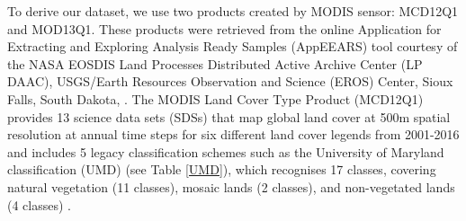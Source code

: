 To derive our dataset, we use two products created by MODIS sensor: MCD12Q1 and MOD13Q1. These products were retrieved from the online Application for Extracting and Exploring Analysis Ready Samples (AppEEARS) tool courtesy of the NASA EOSDIS Land Processes Distributed Active Archive Center (LP DAAC), USGS/Earth Resources Observation and Science (EROS) Center, Sioux Falls, South Dakota, \citep{didan_2015,didan_munoz_2015,sulla_2015,sulla2_2018}. The MODIS Land Cover Type Product (MCD12Q1) provides 13 science data sets (SDSs) that map global land cover at 500m spatial resolution at annual time steps for six different land cover legends from 2001-2016 and includes 5 legacy classification schemes such as the University of Maryland classification (UMD) (see Table \ref{UMD}), which recognises 17 classes, covering natural vegetation (11 classes), mosaic lands (2 classes), and non-vegetated lands (4 classes) \citep{setiawan_2014, friedl_2018}. 

